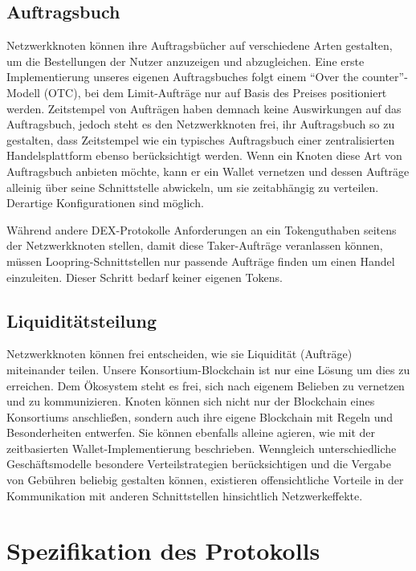 \documentclass[UTF8,nofonts]{article}
\begin{document}
\begin{multicols}{2}
\subsection{Auftragsbuch\label{sec:order_book}}
Netzwerkknoten können ihre Auftragsbücher auf verschiedene Arten gestalten, um die Bestellungen der Nutzer anzuzeigen und abzugleichen. Eine erste Implementierung unseres eigenen Auftragsbuches folgt einem \enquote{Over the counter}-Modell (OTC), bei dem Limit-Aufträge nur auf Basis des Preises positioniert werden. Zeitstempel von Aufträgen haben demnach keine Auswirkungen auf das Auftragsbuch, jedoch steht es den Netzwerkknoten frei, ihr Auftragsbuch so zu gestalten, dass Zeitstempel wie ein typisches Auftragsbuch einer zentralisierten Handelsplattform ebenso berücksichtigt werden. Wenn ein Knoten diese Art von Auftragsbuch anbieten möchte, kann er ein Wallet vernetzen und dessen Aufträge alleinig über seine Schnittstelle abwickeln, um sie zeitabhängig zu verteilen. Derartige Konfigurationen sind möglich.

Während andere DEX-Protokolle Anforderungen an ein Tokenguthaben seitens der Netzwerkknoten stellen, damit diese Taker-Aufträge veranlassen können, müssen Loopring-Schnittstellen nur passende Aufträge finden um einen Handel einzuleiten. Dieser Schritt bedarf keiner eigenen Tokens.

\subsection{Liquiditätsteilung\label{sec:liquidity_sharing}}
Netzwerkknoten können frei entscheiden, wie sie Liquidität (Aufträge) miteinander teilen. Unsere Konsortium-Blockchain ist nur eine Lösung um dies zu erreichen. Dem Ökosystem steht es frei, sich nach eigenem Belieben zu vernetzen und zu kommunizieren. Knoten können sich nicht nur der Blockchain eines Konsortiums anschließen, sondern auch ihre eigene Blockchain mit Regeln und Besonderheiten entwerfen. Sie können ebenfalls alleine agieren, wie mit der zeitbasierten Wallet-Implementierung beschrieben. Wenngleich unterschiedliche Geschäftsmodelle besondere Verteilstrategien berücksichtigen und die Vergabe von Gebühren beliebig gestalten können, existieren offensichtliche Vorteile in der Kommunikation mit anderen Schnittstellen hinsichtlich Netzwerkeffekte.

\section{Spezifikation des Protokolls\label{sec:protocol}}


\end{multicols}
\end{document}
